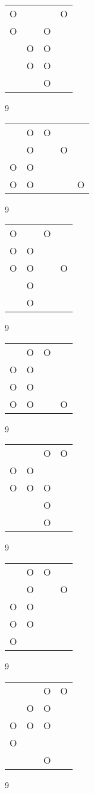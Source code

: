 \begin{tabular}{|m{0.2cm}m{0.2cm}m{0.2cm}m{0.2cm}|}\hline
O& & &O\\
O& &O& \\
 &O&O& \\
 &O&O& \\
 & &O& \\
\hline\end{tabular}9
\begin{tabular}{|m{0.2cm}m{0.2cm}m{0.2cm}m{0.2cm}m{0.2cm}|}\hline
 &O&O& & \\
 &O& &O& \\
O&O& & & \\
O&O& & &O\\
\hline\end{tabular}9
\begin{tabular}{|m{0.2cm}m{0.2cm}m{0.2cm}m{0.2cm}|}\hline
O& &O& \\
O&O& & \\
O&O& &O\\
 &O& & \\
 &O& & \\
\hline\end{tabular}9
\begin{tabular}{|m{0.2cm}m{0.2cm}m{0.2cm}m{0.2cm}|}\hline
 &O&O& \\
O&O& & \\
O&O& & \\
O&O& &O\\
\hline\end{tabular}9
\begin{tabular}{|m{0.2cm}m{0.2cm}m{0.2cm}m{0.2cm}|}\hline
 & &O&O\\
O&O& & \\
O&O&O& \\
 & &O& \\
 & &O& \\
\hline\end{tabular}9
\begin{tabular}{|m{0.2cm}m{0.2cm}m{0.2cm}m{0.2cm}|}\hline
 &O&O& \\
 &O& &O\\
O&O& & \\
O&O& & \\
O& & & \\
\hline\end{tabular}9
\begin{tabular}{|m{0.2cm}m{0.2cm}m{0.2cm}m{0.2cm}|}\hline
 & &O&O\\
 &O&O& \\
O&O&O& \\
O& & & \\
 & &O& \\
\hline\end{tabular}9
